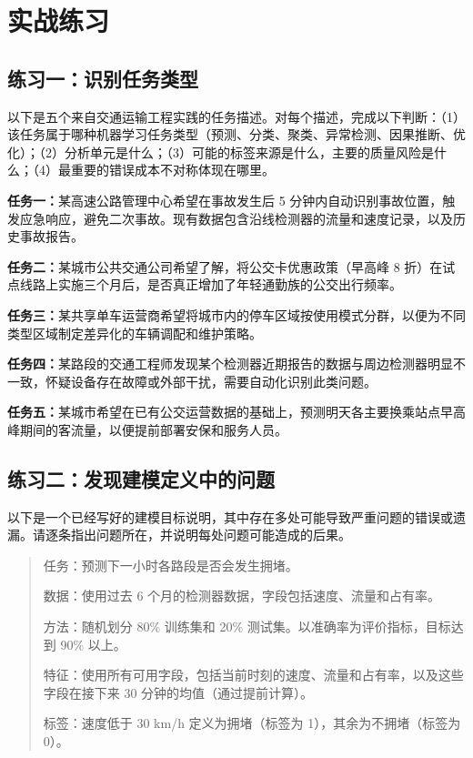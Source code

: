 \section{实战练习}

\subsection*{练习一：识别任务类型}

以下是五个来自交通运输工程实践的任务描述。对每个描述，完成以下判断：（1）该任务属于哪种机器学习任务类型（预测、分类、聚类、异常检测、因果推断、优化）；（2）分析单元是什么；（3）可能的标签来源是什么，主要的质量风险是什么；（4）最重要的错误成本不对称体现在哪里。

\smallskip
\textbf{任务一：}某高速公路管理中心希望在事故发生后 5 分钟内自动识别事故位置，触发应急响应，避免二次事故。现有数据包含沿线检测器的流量和速度记录，以及历史事故报告。

\smallskip
\textbf{任务二：}某城市公共交通公司希望了解，将公交卡优惠政策（早高峰 8 折）在试点线路上实施三个月后，是否真正增加了年轻通勤族的公交出行频率。

\smallskip
\textbf{任务三：}某共享单车运营商希望将城市内的停车区域按使用模式分群，以便为不同类型区域制定差异化的车辆调配和维护策略。

\smallskip
\textbf{任务四：}某路段的交通工程师发现某个检测器近期报告的数据与周边检测器明显不一致，怀疑设备存在故障或外部干扰，需要自动化识别此类问题。

\smallskip
\textbf{任务五：}某城市希望在已有公交运营数据的基础上，预测明天各主要换乘站点早高峰期间的客流量，以便提前部署安保和服务人员。

\subsection*{练习二：发现建模定义中的问题}

以下是一个已经写好的建模目标说明，其中存在多处可能导致严重问题的错误或遗漏。请逐条指出问题所在，并说明每处问题可能造成的后果。

\begin{quote}
任务：预测下一小时各路段是否会发生拥堵。

数据：使用过去 6 个月的检测器数据，字段包括速度、流量和占有率。

方法：随机划分 80\% 训练集和 20\% 测试集。以准确率为评价指标，目标达到 90\% 以上。

特征：使用所有可用字段，包括当前时刻的速度、流量和占有率，以及这些字段在接下来 30 分钟的均值（通过提前计算）。

标签：速度低于 30 km/h 定义为拥堵（标签为 1），其余为不拥堵（标签为 0）。
\end{quote}

